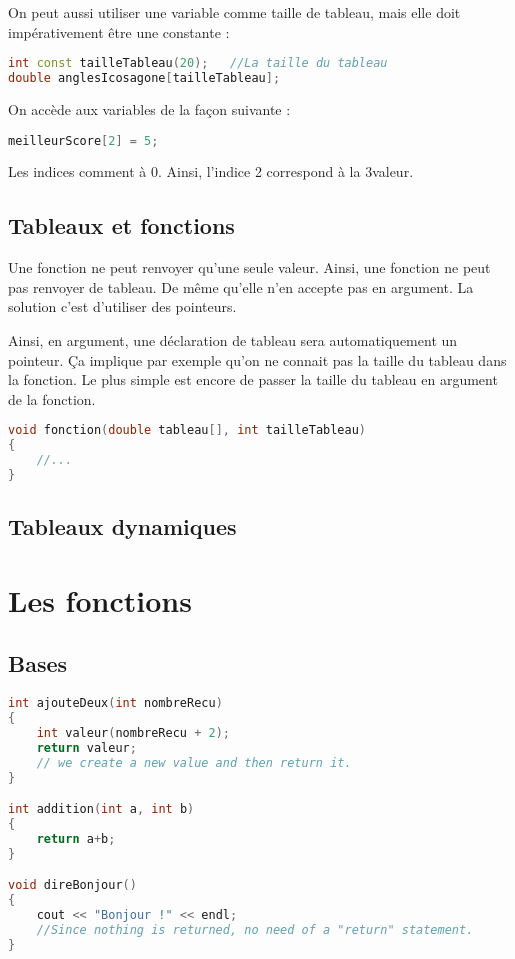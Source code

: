 \documentclass[a4paper,twoside]{article}
\begin{document}
On peut aussi utiliser une variable comme taille de tableau, mais elle doit impérativement être une constante :
\begin{lstlisting}[language=C++]
int const tailleTableau(20);   //La taille du tableau
double anglesIcosagone[tailleTableau];
\end{lstlisting}

\bigskip

On accède aux variables de la façon suivante :
\begin{lstlisting}[language=C++]
meilleurScore[2] = 5;
\end{lstlisting}

\begin{attention}
Les indices comment à 0. Ainsi, l'indice 2 correspond à la 3\ieme valeur.
\end{attention}

\subsection{Tableaux et fonctions}\label{sec:tableaux_fonctions}
Une fonction ne peut renvoyer qu'une seule valeur. Ainsi, une fonction ne peut pas renvoyer de tableau. De même qu'elle n'en 
accepte pas en argument. La solution c'est d'utiliser des pointeurs. 

Ainsi, en argument, une déclaration de tableau sera automatiquement un pointeur. Ça implique par exemple qu'on ne connait pas 
la taille du tableau dans la fonction. Le plus simple est encore de passer la taille du tableau en argument de la fonction. 

\begin{lstlisting}[language=C++]
void fonction(double tableau[], int tailleTableau)
{
    //...
}
\end{lstlisting}

\subsection{Tableaux dynamiques}

\section{Les fonctions}
\subsection{Bases}
\begin{lstlisting}[language=C++]
int ajouteDeux(int nombreRecu)
{
    int valeur(nombreRecu + 2);
    return valeur;
    // we create a new value and then return it.
}

int addition(int a, int b)
{
    return a+b;
}

void direBonjour()
{
    cout << "Bonjour !" << endl;
    //Since nothing is returned, no need of a "return" statement.
}
\end{lstlisting}
\end{document}
